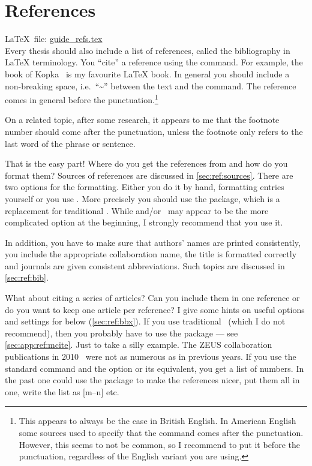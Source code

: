 
\chapter{References}%
\label{sec:ref}

\LaTeX\ file: \href{run:./guide_refs.tex}{guide\_refs.tex}\\[1ex]
\noindent
Every thesis should also include a list of references, called the
bibliography in \LaTeX{} terminology. You \enquote{cite} a reference using
the  command. For example, the book of
Kopka~\cite{kopka04} is my favourite \LaTeX{} book. In general you
should include a non-breaking space, i.e.\ \enquote{\textasciitilde} between
the text and the  command.
The reference comes in general before the punctuation.\footnote{%
  This appears to always be the case in British English.
  In American English some sources used to specify that the  command comes after
  the punctuation. However, this seems to not be common, so I recommend to put it before the punctuation,
  regardless of the English variant you are using.}

  On a related topic, after some research, it appears to me that the footnote
number should come after the punctuation, unless the footnote only
refers to the last word of the phrase or sentence.
  
That is the easy part!  Where do you get the references from and how
do you format them? Sources of references are discussed in \cref{sec:ref:sources}.
There are two options for the formatting. Either you do it by
hand, formatting  entries yourself or you use
\BibTeX. 
More precisely you should use the  package,
which is a replacement for traditional \BibTeX.
While  and/or \BibTeX\ may appear to be the more complicated option
at the beginning, I strongly recommend that you use it.

In addition, you have to make sure that authors' names are
printed consistently, you include the appropriate collaboration
name, the title is formatted correctly and journals are given
consistent abbreviations. Such topics are discussed in
\cref{sec:ref:bib}.

What about citing a series of articles? Can you
include them in one reference or do you want to keep one article per
reference?
I give some hints on
useful options and settings for  below (\cref{sec:ref:bbx}).
If you use traditional \BibTeX\ (which I do not recommend),
then you probably have to use the 
package --- see \cref{sec:app:ref:mcite}.
Just to take a silly example. The ZEUS collaboration
publications in
2010~\cite{Abramowicz:2010ih,Abramowicz:2010xc,Abramowicz:2010nj} were
not as numerous as in previous years. If you use the standard
 command and the  option or its equivalent,
you get a list of numbers.
In the past one could use the
 package to make the references nicer, put them all in
one, write the list as [m--n] etc.


